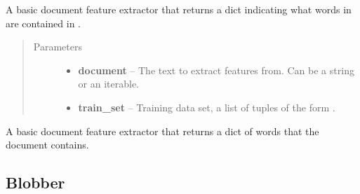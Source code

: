 \documentclass[letterpaper,10pt,english]{sphinxmanual}
\begin{document}

\begin{fulllineitems}
\label{api_reference:textblob.classifiers.basic_extractor}
A basic document feature extractor that returns a dict indicating
what words in  are contained in .
\begin{quote}\begin{description}
\item[{Parameters}] \leavevmode\begin{itemize}
\item {} 
\textbf{document} -- The text to extract features from. Can be a string or an iterable.

\item {} 
\textbf{train\_set} -- Training data set, a list of tuples of the form
.

\end{itemize}

\end{description}\end{quote}

\end{fulllineitems}


\begin{fulllineitems}
\label{api_reference:textblob.classifiers.contains_extractor}
A basic document feature extractor that returns a dict of words that
the document contains.

\end{fulllineitems}



\subsection{Blobber}
\label{api_reference:blobber}
\end{document}

